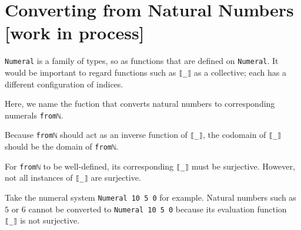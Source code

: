 \documentclass[\main/thesis.tex]{subfiles}
\begin{document}
\section{Converting from Natural Numbers [work in process]}\label{fromnat}

\lstinline|Numeral| is a family of types, so as functions that are defined on
\lstinline|Numeral|.
It would be important to regard functions such as \lstinline|⟦_⟧| as a collective;
each has a different configuration of indices.

Here, we name the fuction that converts natural numbers to corresponding
numerals \lstinline|fromℕ|.

\begin{center}
\end{center}

Because \lstinline|fromℕ| should act as an inverse function of \lstinline|⟦_⟧|,
the codomain of \lstinline|⟦_⟧| should be the domain of \lstinline|fromℕ|.

For \lstinline|fromℕ| to be well-defined, its corresponding \lstinline|⟦_⟧|
must be surjective.
However, not all instances of \lstinline|⟦_⟧| are surjective.

Take the numeral system \lstinline|Numeral 10 5 0| for example.
Natural numbers such as $ 5 $ or $ 6 $ cannot be converted to
\lstinline|Numeral 10 5 0| because its evaluation function \lstinline|⟦_⟧|
is not surjective.
\end{document}
